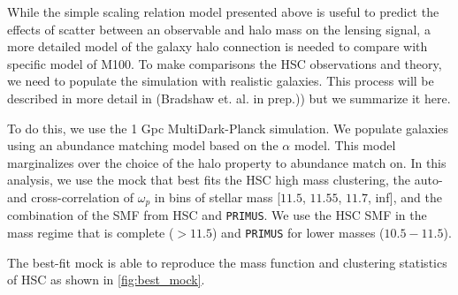 \documentclass[a4paper,fleqn,usenatbib]{mnras}
\begin{document}
    
    While the simple scaling relation model presented above is useful to predict the effects of
    scatter between an observable and halo mass on the lensing signal, a more detailed model of
    the galaxy halo connection is needed to compare with specific model of M100. To make
    comparisons the HSC observations and theory, we need to populate the simulation with
    realistic galaxies. This process will be described in more detail in (Bradshaw et. al. in
    prep.)) but we summarize it here.
    
    To do this, we use the 1 Gpc MultiDark-Planck simulation. We populate galaxies using an
    abundance matching model based on the \citet{Lehmann2017} $\alpha$ model. This model
    marginalizes over the choice of the halo property to abundance match on. In this analysis, we
    use the mock that best fits the HSC high mass clustering, the auto- and cross-correlation of
    $\omega_p$ in bins of stellar mass [$11.5$, $11.55$, $11.7$, inf], and the combination of the
    SMF from HSC and \texttt{PRIMUS}. We use the HSC SMF in the mass regime that is complete ($>
    11.5$) and \texttt{PRIMUS} for lower masses ($10.5 - 11.5$).
    
    The best-fit mock is able to reproduce the mass function and clustering statistics of HSC as
    shown in \ref{fig:best_mock}.
\end{document}

